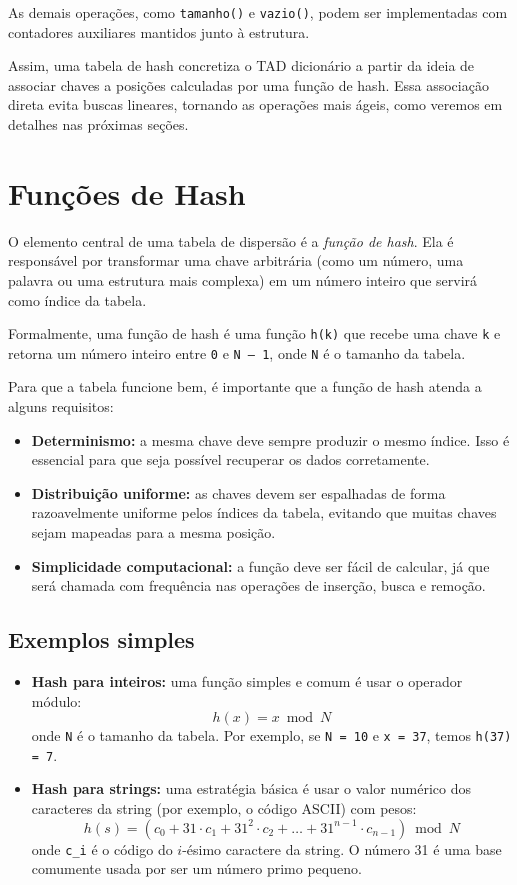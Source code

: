 As demais operações, como \texttt{tamanho()} e \texttt{vazio()}, podem ser implementadas com contadores auxiliares mantidos junto à estrutura.

Assim, uma tabela de hash concretiza o TAD dicionário a partir da ideia de associar chaves a posições calculadas por uma função de hash. 
Essa associação direta evita buscas lineares, tornando as operações mais ágeis, como veremos em detalhes nas próximas seções.

\section{Funções de Hash}

O elemento central de uma tabela de dispersão é a \emph{função de hash}. 
Ela é responsável por transformar uma chave arbitrária (como um número, uma palavra ou uma estrutura mais complexa) em um número inteiro que servirá como índice da tabela.

Formalmente, uma função de hash é uma função \texttt{h(k)} que recebe uma chave \texttt{k} e retorna um número inteiro entre \texttt{0} e \texttt{N -- 1}, onde \texttt{N} é o tamanho da tabela.

Para que a tabela funcione bem, é importante que a função de hash atenda a alguns requisitos:

\begin{itemize}
  \item \textbf{Determinismo:} a mesma chave deve sempre produzir o mesmo índice. 
  Isso é essencial para que seja possível recuperar os dados corretamente.
  
  \item \textbf{Distribuição uniforme:} as chaves devem ser espalhadas de forma razoavelmente uniforme pelos índices da tabela, evitando que muitas chaves sejam mapeadas para a mesma posição.
  
  \item \textbf{Simplicidade computacional:} a função deve ser fácil de calcular, já que será chamada com frequência nas operações de inserção, busca e remoção.
\end{itemize}

\subsection*{Exemplos simples}

\begin{itemize}
  \item \textbf{Hash para inteiros:} uma função simples e comum é usar o operador módulo:
  \[
  h(x) = x \bmod N
  \]
  onde \texttt{N} é o tamanho da tabela. Por exemplo, se \texttt{N = 10} e \texttt{x = 37}, temos \texttt{h(37) = 7}.
  
  \item \textbf{Hash para strings:} uma estratégia básica é usar o valor numérico dos caracteres da string (por exemplo, o código ASCII) com pesos:
  \[
  h(s) = (c_0 + 31 \cdot c_1 + 31^2 \cdot c_2 + \dots + 31^{n-1} \cdot c_{n-1}) \bmod N
  \]
  onde \texttt{c\_i} é o código do $i$-ésimo caractere da string. O número 31 é uma base comumente usada por ser um número primo pequeno.
\end{itemize}

